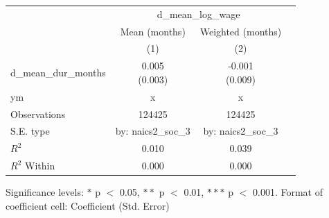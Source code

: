 \renewcommand\cellalign{t}
\begin{threeparttable}
\begin{tabular}{lccc}
\toprule
 & \multicolumn{2}{c}{d_mean_log_wage} \\
\cmidrule(lr){2-3} 
 & Mean (months) & Weighted (months) \\
 & (1) & (2) \\
\midrule
\addlinespace
d_mean_dur_months & \makecell{0.005 \\ (0.003)} & \makecell{-0.001 \\ (0.009)} \\
\midrule
\addlinespace
ym & x & x \\
\midrule
\addlinespace
Observations & 124425 & 124425 \\
S.E. type & by: naics2_soc_3 & by: naics2_soc_3 \\
$R^2$ & 0.010 & 0.039 \\
$R^2$ Within & 0.000 & 0.000 \\
\bottomrule
\end{tabular}
\footnotesize Significance levels: $*$ p $<$ 0.05, $**$ p $<$ 0.01, $***$ p $<$ 0.001. Format of coefficient cell: Coefficient 
 (Std. Error)
\end{threeparttable}